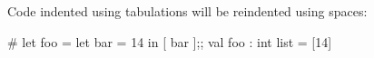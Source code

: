 Code indented using tabulations will be reindented using spaces:

\begin{ocaml}
# let foo =
	let bar = 14 in
	[ bar ];;
val foo : int list = [14]
\end{ocaml}

